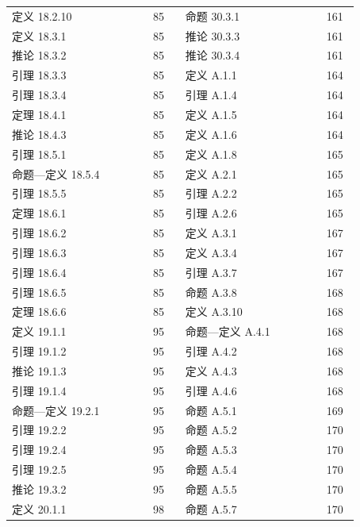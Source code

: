 \documentclass[UTF8,10pt,fontset=windows]{ctexart}
\begin{document}
{\begin{longtable}{@{}p{0.355\linewidth}p{0.085\linewidth}p{0.355\linewidth}p{0.085\linewidth}@{}}
定义 18.2.10 & 85 & 命题 30.3.1 & 161 \\
定义 18.3.1 & 85 & 推论 30.3.3 & 161 \\
推论 18.3.2 & 85 & 推论 30.3.4 & 161 \\
引理 18.3.3 & 85 & 定义 A.1.1 & 164 \\
引理 18.3.4 & 85 & 引理 A.1.4 & 164 \\
定理 18.4.1 & 85 & 定义 A.1.5 & 164 \\
推论 18.4.3 & 85 & 定义 A.1.6 & 164 \\
引理 18.5.1 & 85 & 定义 A.1.8 & 165 \\
命题—定义 18.5.4 & 85 & 定义 A.2.1 & 165 \\
引理 18.5.5 & 85 & 引理 A.2.2 & 165 \\
定理 18.6.1 & 85 & 引理 A.2.6 & 165 \\
引理 18.6.2 & 85 & 定义 A.3.1 & 167 \\
引理 18.6.3 & 85 & 定义 A.3.4 & 167 \\
引理 18.6.4 & 85 & 引理 A.3.7 & 167 \\
引理 18.6.5 & 85 & 命题 A.3.8 & 168 \\
定理 18.6.6 & 85 & 定义 A.3.10 & 168 \\
定义 19.1.1 & 95 & 命题—定义 A.4.1 & 168 \\
引理 19.1.2 & 95 & 引理 A.4.2 & 168 \\
推论 19.1.3 & 95 & 定义 A.4.3 & 168 \\
引理 19.1.4 & 95 & 引理 A.4.6 & 168 \\
命题—定义 19.2.1 & 95 & 命题 A.5.1 & 169 \\
引理 19.2.2 & 95 & 命题 A.5.2 & 170 \\
引理 19.2.4 & 95 & 命题 A.5.3 & 170 \\
引理 19.2.5 & 95 & 命题 A.5.4 & 170 \\
推论 19.3.2 & 95 & 命题 A.5.5 & 170 \\
定义 20.1.1 & 98 & 命题 A.5.7 & 170 \\
\bottomrule
\end{longtable}}
\end{document}

